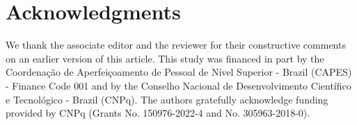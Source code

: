 \section*{Acknowledgments}

We thank the associate editor and the reviewer for their constructive comments on an earlier version
of this article. This study was financed in part by the Coordenação de Aperfeiçoamento de Pessoal de Nível Superior
- Brazil (CAPES) - Finance Code 001 and by the Conselho Nacional de Desenvolvimento Científico e
Tecnológico - Brazil (CNPq). The authors gratefully acknowledge funding provided by CNPq
(Grants No. 150976-2022-4 and No. 305963-2018-0). 



\address{
  Francisco F. Queiroz\\
  Department of Statistics, University of S\~ao Paulo\\
  Rua do Mat\~ao, 1010\\
  05508-090, S\~ao Paulo, Brazil\\
  E-mail: 
  }
  
\address{
  Silvia L.P. Ferrari\\
  Department of Statistics, University of S\~ao Paulo\\
  Rua do Mat\~ao, 1010\\
  05508-090, S\~ao Paulo, Brazil\\
  E-mail: 
  }
